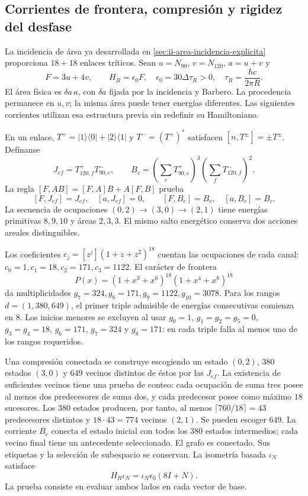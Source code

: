 \subsection{Corrientes de frontera, compresión y rigidez del desfase}
\label{sec:ii-ter27-corrientes}

La incidencia de área ya desarrollada en \ref{sec:ii-area-incidencia-explicita}
proporciona $18+18$ enlaces tríticos. Sean $u=N_{90}$, $v=N_{120}$,
$a=u+v$ y
\[
 F=3u+4v,\qquad H_R=\epsilon_0 F,
 \quad\epsilon_0=30\Delta\tau_R>0,
 \quad\tau_R=\frac{\hbar c}{2\pi R}.
\]
El área física es $\delta a\,a$, con $\delta a$ fijada por la incidencia
y Barbero. La procedencia permanece en $u,v$; la misma área puede tener
energías diferentes. Las siguientes corrientes utilizan esa estructura
previa sin redefinir su Hamiltoniano.

En un enlace, $T^+=|1\rangle\langle0|+|2\rangle\langle1|$ y
$T^-=(T^+)^*$ satisfacen $[n,T^\pm]=\pm T^\pm$. Defínanse
\[
 J_{ef}=T^+_{120,f}T^-_{90,e},\qquad
 B_c=\left(\sum_eT^+_{90,e}\right)^3
     \left(\sum_fT^-_{120,f}\right)^2.
\]
La regla $[F,AB]=[F,A]B+A[F,B]$ prueba
\[
 [F,J_{ef}]=J_{ef},\quad[a,J_{ef}]=0,
 \qquad[F,B_c]=B_c,\quad[a,B_c]=B_c.
\]
La secuencia de ocupaciones $(0,2)\to(3,0)\to(2,1)$ tiene energías
primitivas $8,9,10$ y áreas $2,3,3$. El mismo salto energético conserva
dos acciones areales distinguibles.

Los coeficientes $c_j=[z^j](1+z+z^2)^{18}$ cuentan las ocupaciones de
cada canal: $c_0=1,c_1=18,c_2=171,c_3=1122$. El carácter de frontera
\[
 P(x)=(1+x^3+x^6)^{18}(1+x^4+x^8)^{18}
\]
da multiplicidades $g_7=324,g_8=171,g_9=1122,g_{10}=3078$.
Para los rangos $d=(1,380,649)$, el primer triple admisible de energías
consecutivas comienza en $8$. Los inicios menores se excluyen al usar
$g_0=1$, $g_1=g_2=g_5=0$, $g_3=g_4=18$, $g_6=171$, $g_7=324$ y
$g_8=171$: en cada triple falla al menos uno de los rangos requeridos.

Una compresión conectada se construye escogiendo un estado $(0,2)$,
$380$ estados $(3,0)$ y $649$ vecinos distintos de éstos por las $J_{ef}$.
La existencia de suficientes vecinos tiene una prueba de conteo: cada
ocupación de suma tres posee al menos dos predecesores de suma dos, y
cada predecesor posee como máximo $18$ sucesores. Los $380$ estados
producen, por tanto, al menos $\lceil760/18\rceil=43$ predecesores
distintos y $18\cdot43=774$ vecinos $(2,1)$. Se pueden escoger $649$.
La corriente $B_c$ conecta el estado inicial con todos los $380$ estados
intermedios; cada vecino final tiene un antecedente seleccionado. El grafo
es conectado. Sus etiquetas y la selección de subespacio se conservan.
La isometría basada $\iota_N$ satisface
\begin{equation}
 H_R\iota_N=\iota_N\epsilon_0(8I+N).
 \label{eq:ii-ter27-compresion}
\end{equation}
La prueba consiste en evaluar ambos lados en cada vector de base.


